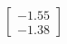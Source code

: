 \documentclass[preview]{standalone}
\begin{document}
\begin{align*}
\begin{bmatrix} -1.55 \\ -1.38 \end{bmatrix}
\end{align*}
\end{document}
